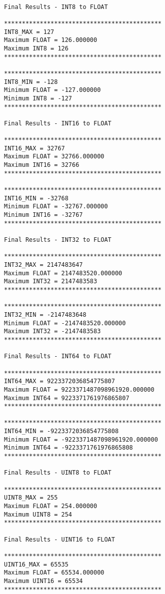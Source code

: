\begin{verbatim}

Final Results - INT8 to FLOAT

********************************************
INT8_MAX = 127
Maximum FLOAT = 126.000000
Maximum INT8 = 126
********************************************

********************************************
INT8_MIN = -128
Minimum FLOAT = -127.000000
Minimum INT8 = -127
********************************************

Final Results - INT16 to FLOAT

********************************************
INT16_MAX = 32767
Maximum FLOAT = 32766.000000
Maximum INT16 = 32766
********************************************

********************************************
INT16_MIN = -32768
Minimum FLOAT = -32767.000000
Minimum INT16 = -32767
********************************************

Final Results - INT32 to FLOAT

********************************************
INT32_MAX = 2147483647
Maximum FLOAT = 2147483520.000000
Maximum INT32 = 2147483583
********************************************

********************************************
INT32_MIN = -2147483648
Minimum FLOAT = -2147483520.000000
Maximum INT32 = -2147483583
********************************************

Final Results - INT64 to FLOAT

********************************************
INT64_MAX = 9223372036854775807
Maximum FLOAT = 9223371487098961920.000000
Maximum INT64 = 9223371761976865807
********************************************

********************************************
INT64_MIN = -9223372036854775808
Minimum FLOAT = -9223371487098961920.000000
Minimum INT64 = -9223371761976865808
********************************************

Final Results - UINT8 to FLOAT

********************************************
UINT8_MAX = 255
Maximum FLOAT = 254.000000
Maximum UINT8 = 254
********************************************

Final Results - UINT16 to FLOAT

********************************************
UINT16_MAX = 65535
Maximum FLOAT = 65534.000000
Maximum UINT16 = 65534
********************************************


\end{verbatim}

